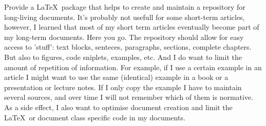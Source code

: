 
Provide a \LaTeX~package that helps to create and maintain a repository for long-living documents. It's 
probably not usefull for some short-term articles, however, I learned that most of my short term articles 
eventually become part of my long-term documents. Here you go. The repository should allow for easy access
to 'stuff': text blocks, senteces, paragraphs, sections, complete chapters. But also to figures, code 
sniplets, examples, etc. And I do want to limit the amount of repetition of information. For example, if 
I use a certain example in an article I might want to use the same (identical) example in a book or a 
presentation or lecture notes. If I only copy the example I have to maintain several sources, and over time 
I will not remember which of them is normative. As a side effect, I also want to optimise document creation
and limit the \LaTeX~or document class specific code in my documents.